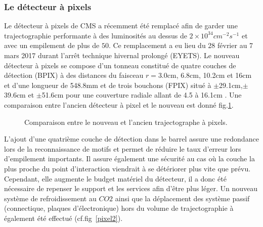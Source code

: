 \subsubsection{Le détecteur à pixels}
Le détecteur à pixels de CMS a récemment été remplacé afin de garder une trajectographie performante à des luminosités au dessus de $2\times10^{34}cm^{-2}s^{-1}$ et avec un empilement de plus de $50$. Ce remplacement a eu lieu du 28 février au 7 mars 2017 durant l'arrêt technique hivernal prolongé (EYETS). Le nouveau détecteur à pixels se compose d'un tonneau constitué de quatre couches de détection (BPIX) à des distances du faisceau $r=3.0$cm, 6.8cm, 10.2cm et 16cm et d'une longueur de 548.8mm et de trois bouchons (FPIX) situé à $\pm$29.1cm,$\pm$39.6cm et $\pm$51.6cm pour une couverture radiale allant de 4.5 à 16.1cm . Une comparaison entre l'ancien détecteur à pixel et le nouveau est donné fig.\ref{pixel}.

	\begin{figure}[ht!]
	\hfill
	\caption{Comparaison entre le nouveau et l'ancien trajectographe à pixels.}
	\label{pixel}
\end{figure}

L'ajout d'une quatrième couche de détection dans le barrel assure une redondance lors de la reconnaissance de motifs et permet de réduire le taux d'erreur lors d'empilement importants. Il assure également une sécurité au cas où la couche la plus proche du point d'interaction viendrait à se détériorer plus vite que prévu. Cependant, elle augmente le budget matériel du détecteur, il a donc été nécessaire de repenser le support et les services afin d'être plus léger. Un nouveau système de refroidissement au $CO2$ ainsi que la déplacement des système passif (connectique, plaques d'électronique) hors du volume de trajectographie à également été effectué (cf.fig~\ref{pixel2}).


